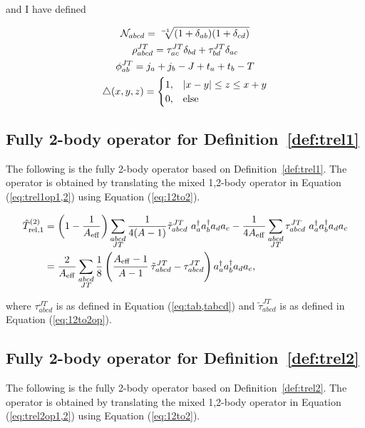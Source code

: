 \documentclass{article}
\def\aeff{A_{\rm{eff}}}
\def\trelopi_#1^#2{\hat{T}_{\rm{rel}, #1}^{#2}}
\def\creop{a^{\dagger}}
\def\annop{a}
\begin{document}
and I have defined

\begin{gather*}
  \mathcal{N}_{abcd} = \sqrt[-1]{(1+\delta_{ab})(1+\delta_{cd})}\\
  \rho_{abcd}^{JT} = \tau_{ac}^{JT}\delta_{bd} + \tau_{bd}^{JT}\delta_{ac}\\
  \phi_{ab}^{JT} = j_a+j_b-J + t_a+t_b-T\\
  \bigtriangleup(x,y,z) = 
  \begin{cases}
    1, & |x-y|\leq z\leq x+y\\
    0, & \rm{else}\\
  \end{cases}
\end{gather*}

\subsection{Fully 2-body operator for Definition~\ref{def:trel1}}
The following is the fully 2-body operator based on Definition~\ref{def:trel1}.
The operator is obtained by translating the mixed 1,2-body operator in
Equation (\ref{eq:trel1op1,2}) using Equation (\ref{eq:12to2}).

\begin{equation}\label{eq:trel1op2}
  \begin{aligned}
    \trelopi_1^{(2)} &= \left(1-\frac{1}{\aeff}\right)
    \displaystyle\sum_{\substack{abcd\\JT}} \frac{1}{4(A-1)}
    \tilde{\tau}_{abcd}^{JT}~\creop_a\creop_b\annop_d\annop_c
    -\frac{1}{4\aeff} \displaystyle\sum_{\substack{abcd\\JT}}
    \tau_{abcd}^{JT}~\creop_a\creop_b\annop_d\annop_c\\
    &= \frac{2}{\aeff} \displaystyle\sum_{\substack{abcd\\JT}}
    \frac{1}{8}\left(
    \cfrac{\aeff-1}{A-1}~\tilde{\tau}_{abcd}^{JT} - \tau_{abcd}^{JT}
    \right)\creop_a\creop_b\annop_d\annop_c,
  \end{aligned}
\end{equation}

where $\tau_{abcd}^{JT}$ is as defined in Equation (\ref{eq:tab,tabcd}) and
$\tilde{\tau}_{abcd}^{JT}$ is as defined in Equation (\ref{eq:12to2op}).

\subsection{Fully 2-body operator for Definition~\ref{def:trel2}}
The following is the fully 2-body operator based on Definition~\ref{def:trel2}.
The operator is obtained by translating the mixed 1,2-body operator in
Equation (\ref{eq:trel2op1,2}) using Equation (\ref{eq:12to2}).
\end{document}
